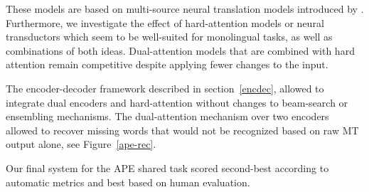 \documentclass[11pt,a4paper]{article}
\begin{document}
  These models are based on multi-source neural translation models introduced by . Furthermore, we investigate the effect of hard-attention models or neural transductors \cite{aharoni2016sequence} which seem to be well-suited for monolingual tasks, as well as combinations of both ideas. 
  Dual-attention models that are combined with hard attention remain competitive despite applying fewer changes to the input.

  The encoder-decoder framework described in section~\ref{encdec}, allowed to integrate dual encoders and hard-attention without changes to beam-search or ensembling mechanisms.
  The dual-attention mechanism over two encoders allowed to recover missing words that would not be recognized based on raw MT output alone, see Figure~\ref{ape-rec}.

  Our final system for the APE shared task scored second-best according to automatic metrics and best based on human evaluation.


\end{document}
